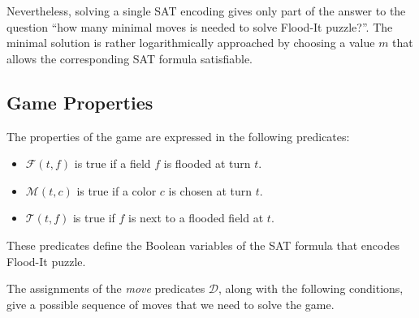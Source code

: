 \documentclass[conference]{IEEEtran}
\newcommand{\quotes}[1]{``#1''}
\newcommand{\nMoves}{\ensuremath{m}\xspace}
\newcommand{\clr}{\ensuremath{c}\xspace}
\newcommand{\flood}[2]{\ensuremath{\mathcal{F}(#1,#2)}\xspace}
\newcommand{\move}[2]{\ensuremath{\mathcal{M}(#1,#2)}\xspace}
\newcommand{\touch}[2]{\ensuremath{\mathcal{T}(#1,#2)}\xspace}
\newcommand{\turn}{\ensuremath{t}\xspace}
\newcommand{\field}{\ensuremath{f}\xspace}
\begin{document}
Nevertheless, solving a single SAT encoding gives only part of the answer to the question \quotes{how many minimal moves is needed to solve Flood-It puzzle?}. The minimal solution is rather logarithmically approached by choosing a value \nMoves that allows the corresponding SAT formula satisfiable.
\subsection{Game Properties}
The properties of the game are expressed in the following predicates: 
\begin{itemize}
	\item \flood{\turn}{\field} is true if a field \field is flooded at turn \turn. 
	\item \move{\turn}{\clr} is true if a color \clr is chosen at turn \turn. 
	\item \touch{\turn}{\field} is true if \field is next to a flooded field at \turn. 
\end{itemize}
These predicates define the Boolean variables of the SAT formula that encodes Flood-It puzzle. 

The assignments of the \emph{move} predicates $\mathcal{D}$, along with the following conditions, give a possible sequence of moves that we need to solve the game. 
\end{document}

